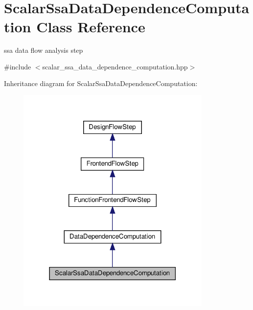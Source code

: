 \hypertarget{classScalarSsaDataDependenceComputation}{}\section{Scalar\+Ssa\+Data\+Dependence\+Computation Class Reference}
\label{classScalarSsaDataDependenceComputation}


ssa data flow analysis step  




{\ttfamily \#include $<$scalar\+\_\+ssa\+\_\+data\+\_\+dependence\+\_\+computation.\+hpp$>$}



Inheritance diagram for Scalar\+Ssa\+Data\+Dependence\+Computation\+:
\nopagebreak
\begin{figure}[H]
\begin{center}
\leavevmode
\includegraphics[width=273pt]{d7/d23/classScalarSsaDataDependenceComputation__inherit__graph}
\end{center}
\end{figure}


